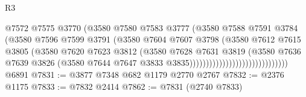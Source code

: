 \begin{lexlean}{R3}
\begin{coremodule}
                                              @7572
                                              @7575
                                              @3770
                                              (@3580
                                                @7580
                                                @7583
                                                @3777
                                                (@3580
                                                  @7588
                                                  @7591
                                                  @3784
                                                  (@3580
                                                    @7596
                                                    @7599
                                                    @3791
                                                    (@3580
                                                      @7604
                                                      @7607
                                                      @3798
                                                      (@3580
                                                        @7612
                                                        @7615
                                                        @3805
                                                        (@3580
                                                          @7620
                                                          @7623
                                                          @3812
                                                          (@3580
                                                            @7628
                                                            @7631
                                                            @3819
                                                            (@3580
                                                              @7636
                                                              @7639
                                                              @3826
                                                              (@3580
                                                                @7644
                                                                @7647
                                                                @3833
                                                                @3835))))))))))))))))))))))))))))))
    @6891
@7831 := @3877 @7348 @682 @1179 @2770 @2767
@7832 := @2376 @1175
@7833 := @7832 @2414
@7862 := @7831
    (@2740 @7833)

\end{coremodule}
\end{lexlean}
